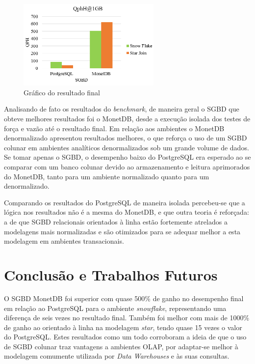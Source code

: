 \documentclass[conference]{IEEEtran}
\begin{document}
\begin{figure}[htpb]
  \centering
  \includegraphics[width=7cm]{resultado}
  \caption{Gráfico do resultado final}
  \label{fig:resultado}
\end{figure}

Analisando de fato os resultados do \textit{benchmark}, de maneira geral o SGBD que obteve melhores resultados foi o MonetDB, desde a execução isolada dos testes de força e vazão até o resultado final. Em relação aos ambientes o MonetDB denormalizado apresentou resultados melhores, o que reforça o uso de um SGBD colunar em ambientes analíticos denormalizados sob um grande volume de dados. Se tomar apenas o SGBD, o desempenho baixo do PostgreSQL era esperado ao se comparar com um banco colunar devido ao armazenamento e leitura aprimorados do MonetDB, tanto para um ambiente normalizado quanto para um denormalizado. 

Comparando os resultados do PostgreSQL de maneira isolada percebeu-se que a lógica nos resultados não é a mesma do MonetDB, e que outra teoria é reforçada: a de que SGBD relacionais orientados à linha estão fortemente atrelados a modelagens mais normalizadas e são otimizados para se adequar melhor a esta modelagem em ambientes transacionais.


\section{Conclusão e Trabalhos Futuros}

O SGBD MonetDB foi superior com quase 500\% de ganho no desempenho final em relação ao PostgreSQL para o ambiente \textit{snowflake}, representando uma diferença de seis vezes no resultado final. Também foi melhor com mais de 1000\% de ganho ao orientado à linha na modelagem \textit{star}, tendo quase 15 vezes o valor do PostgreSQL. Estes resultados como um todo corroboram a ideia de que o uso de SGBD colunar traz vantagens a ambientes OLAP, por adaptar-se melhor à modelagem comumente utilizada por \textit{Data Warehouses} e às suas consultas.
\end{document}
